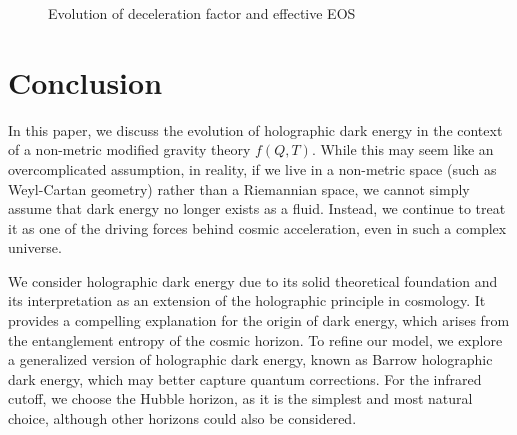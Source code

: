 \documentclass[a4paper,fleqn]{cas-sc}
\begin{document}
\begin{figure}[h]
    \centering
    \caption{Evolution of deceleration factor and effective EOS}
    \label{Fig3.main}
\end{figure}


\section{Conclusion}\label{sec:conclusion}

In this paper, we discuss the evolution of holographic dark energy in the context of a non-metric modified gravity theory $f(Q,T)$. While this may seem like an overcomplicated assumption, in reality, if we live in a non-metric space (such as Weyl-Cartan geometry) rather than a Riemannian space, we cannot simply assume that dark energy no longer exists as a fluid. Instead, we continue to treat it as one of the driving forces behind cosmic acceleration, even in such a complex universe. 

We consider holographic dark energy due to its solid theoretical foundation and its interpretation as an extension of the holographic principle in cosmology. It provides a compelling explanation for the origin of dark energy, which arises from the entanglement entropy of the cosmic horizon. To refine our model, we explore a generalized version of holographic dark energy, known as Barrow holographic dark energy, which may better capture quantum corrections. For the infrared cutoff, we choose the Hubble horizon, as it is the simplest and most natural choice, although other horizons could also be considered.
\end{document}
